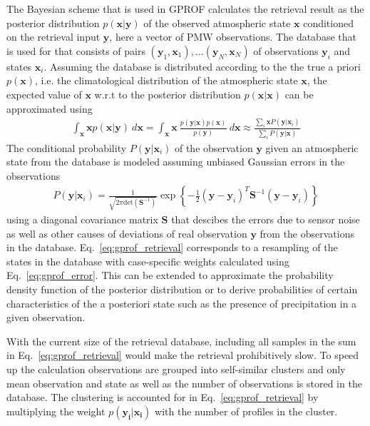 \documentclass[a4paper,11pt,bibtotoc]{scrartcl}
\begin{document}
The Bayesian scheme that is used in GPROF calculates the retrieval result as the
posterior distribution $p(\mathbf{x} | \mathbf{y})$ of the observed atmospheric
state $\mathbf{x}$ conditioned on the retrieval input $\mathbf{y}$, here a
vector of PMW observations. The database that is used for that consists of pairs
$(\mathbf{y}_1, \mathbf{x}_1), \ldots (\mathbf{y}_N, \mathbf{x}_N)$ of
observations $\mathbf{y}_i$ and states $\mathbf{x}_i$. Assuming the database is
distributed according to the the true a priori $p(\mathbf{x})$, i.e. the
climatological distribution of the atmospheric state $\mathbf{x}$, the expected
value of $\mathbf{x}$ w.r.t to the posterior distribution $p(\mathbf{x} |
\mathbf{x})$ can be approximated using
\begin{align}\label{eq:gprof_retrieval}
  \int_{\mathbf{x} } \mathbf{x} p(\mathbf{x} | \mathbf{y})\: d\mathbf{x} =
  \int_{\mathbf{x} } \mathbf{x}\: \frac{p(\mathbf{y} |
    \mathbf{x})p(\mathbf{x})}{p(\mathbf{y})}\: d\mathbf{x} \approx \frac{\sum_i
    \mathbf{x} P(\mathbf{y}|\mathbf{x}_i)}{\sum_i P(\mathbf{y}|\mathbf{x})}
\end{align}
The conditional probability $P(\mathbf{y} | \mathbf{x}_i)$ of the observation
$\mathbf{y}$ given an atmospheric state from the database is modeled assuming
unbiased Gaussian errors in the observations 
\begin{align}\label{eq:gprof_error}
  P(\mathbf{y}|\mathbf{x}_i) = \frac{1}{\sqrt{2\pi\text{det}(\mathbf{S}^{-1})}}
  \exp \left \{ - \frac{1}{2} (\mathbf{y} - \mathbf{y}_i)^T \mathbf{S}^{-1}
  (\mathbf{y} - \mathbf{y}_i) \right \}
\end{align}
using a diagonal covariance matrix $\mathbf{S}$ that descibes the errors due to
sensor noise as well as other causes of deviations of real observation
$\mathbf{y}$ from the observations in the database.
Eq.~\ref{eq:gprof_retrieval} corresponds to a resampling of the states in the
database with case-specific weights calculated using Eq.~\ref{eq:gprof_error}.
This can be extended to approximate the probability density function of the
posterior distribution or to derive probabilities of certain characteristics of
the a posteriori state such as the presence of precipitation in a given
observation.

With the current size of the retrieval database, including all samples in the
sum in Eq.~\ref{eq:gprof_retrieval} would make the retrieval prohibitively slow.
To speed up the calculation observations are grouped into self-similar clusters
and only mean observation and state as well as the number of observations is
stored in the database. The clustering is accounted for in
Eq.~\ref{eq:gprof_retrieval} by multiplying the weight
$p(\mathbf{y_i}|\mathbf{x_i})$ with the number of profiles in the cluster.
\end{document}
